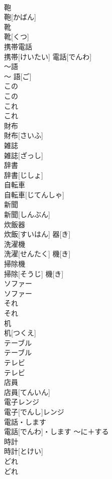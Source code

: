 \documentclass[8pt]{extreport}
\begin{document}
\begin{CJK}{UTF8}{min}
\\	鞄	
\\	鞄[かばん]		
\\	靴	
\\	靴[くつ]		
\\	携帯電話	
\\	携帯[けいたい] 電話[でんわ]		
\\	〜語	
\\	〜 語[ご]		
\\	この	
\\	この		
\\	これ	
\\	これ		
\\	財布	
\\	財布[さいふ]		
\\	雑誌	
\\	雑誌[ざっし]		
\\	辞書	
\\	辞書[じしょ]		
\\	自転車	
\\	自転車[じてんしゃ]		
\\	新聞	
\\	新聞[しんぶん]		
\\	炊飯器	
\\	炊飯[すいはん] 器[き]		
\\	洗濯機	
\\	洗濯[せんたく] 機[き]		
\\	掃除機	
\\	掃除[そうじ] 機[き]		
\\	ソファー	
\\	ソファー		
\\	それ	
\\	それ		
\\	机	
\\	机[つくえ]		
\\	テーブル	
\\	テーブル		
\\	テレビ	
\\	テレビ		
\\	店員	
\\	店員[てんいん]		
\\	電子レンジ	
\\	電子[でんし]レンジ		
\\	電話・します	
\\	電話[でんわ]・します	〜に＋する	
\\	時計	
\\	時計[とけい]		
\\	どれ	
\\	どれ		

\end{CJK}
\end{document}
